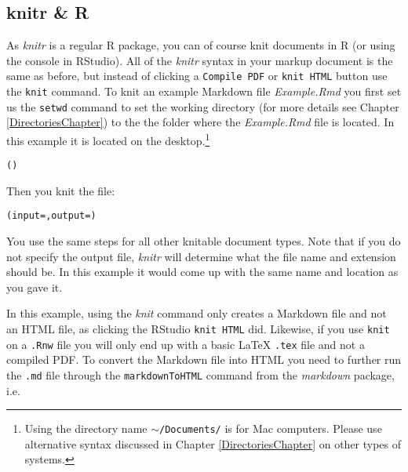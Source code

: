 \subsection{knitr \& R}

As {\emph{knitr}} is a regular R package, you can of course knit documents in R (or using the console in RStudio). All of the {\emph{knitr}} syntax in your markup document is the same as before, but instead of clicking a {\tt{Compile PDF}} or {\tt{knit HTML}} button use the {\tt{knit}} command. To knit an example Markdown file {\emph{Example.Rmd}} you first set us the \texttt{setwd} command to set the working directory (for more details see Chapter \ref{DirectoriesChapter}) to the the folder where the {\emph{Example.Rmd}} file is located. In this example it is located on the desktop.\footnote{Using the directory name {\tt{$\sim$/Documents/}} is for Mac computers. Please use alternative syntax discussed in Chapter \ref{DirectoriesChapter} on other types of systems.}

\begin{knitrout}
\color{fgcolor}\begin{kframe}
\begin{alltt}
()
\end{alltt}
\end{kframe}
\end{knitrout}


\noindent Then you knit the file:

\begin{knitrout}
\color{fgcolor}\begin{kframe}
\begin{alltt}
(input = , output = )
\end{alltt}
\end{kframe}
\end{knitrout}


\noindent You use the same steps for all other knitable document types. Note that if you do not specify the output file, {\emph{knitr}} will determine what the file name and extension should be. In this example it would come up with the same name and location as you gave it.

In this example, using the {\emph{knit}} command only creates a Markdown file and not an HTML file, as clicking the RStudio {\tt{knit HTML}} did. Likewise, if you use {\tt{knit}} on a {\tt{.Rnw}} file you will only end up with a basic LaTeX {\tt{.tex}} file and not a compiled PDF. To convert the Markdown file into HTML you need to further run the {\tt{.md}} file through the {\tt{markdownToHTML}} command from the {\emph{markdown}} package, i.e.

